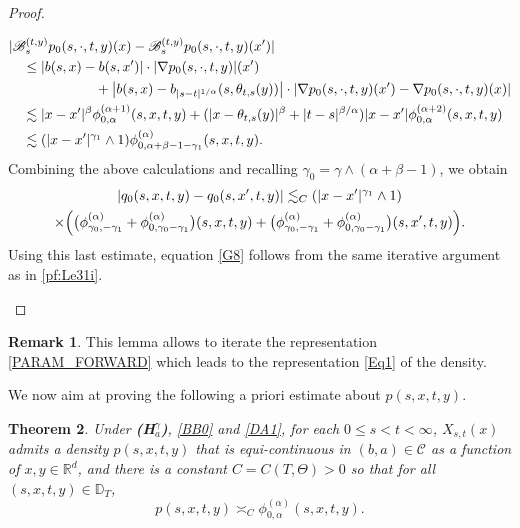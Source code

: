 \documentclass[JEP,XML,SOM,Unicode,published]{cedram}
\theoremstyle{plain}
\newtheorem{theorem}{Theorem}[section]
\theoremstyle{definition}
\newtheorem{remark}[theorem]{Remark}
\newcommand\mD{\mathbb{D}}
\newcommand\mR{\mathbb{R}}
\newcommand\1{{\mathbf{1}}}
\newcommand\sB{{\mathscr B}}
\newcommand\sC{{\mathscr C}}
\begin{document}
\begin{proof}
\begin{enumerate}
\begin{align*}
&|\sB^{(t,y)}_{s} p_0(s,\cdot,t,y)(x)-\sB^{(t,y)}_{s} p_0(s,\cdot,t,y)(x')|\\
&\quad\leq |b(s,x)-b(s,x')|\cdot|\nabla p_0(s,\cdot,t,y)|(x')
\\&\hspace*{2.2cm}+\big|b(s,x)-b_{|s-t|^{1/\alpha}}(s, \theta_{t,s}(y))\big|
\cdot |\nabla p_0(s,\cdot,t,y)(x')-\nabla p_0(s,\cdot,t,y)(x)|
\\&\quad\lesssim|x-x'|^\beta\phi^{(\alpha+1)}_{0,\alpha}(s,x,t,y)+(|x-\theta_{t,s}(y)|^\beta+|t-s|^{\beta/\alpha})|x-x'|\phi^{(\alpha+2)}_{0,\alpha}(s,x,t,y)
\\&\quad\lesssim(|x-x'|^{\gamma_1}\wedge 1)\phi^{(\alpha)}_{0,\alpha+\beta-1-\gamma_1}(s,x,t,y).
\end{align*}
Combining the above calculations and recalling $\gamma_0=\gamma\wedge(\alpha+\beta-1)$, we obtain
\begin{multline*}
|q_0(s,x,t,y)-q_0(s,x',t,y)|\lesssim_C(|x-x'|^{\gamma_1}\wedge1)
\\\times\Bigl(\bigl(\phi^{(\alpha)}_{\gamma_0,-\gamma_1}+\phi^{(\alpha)}_{0,\gamma_0-\gamma_1}\bigr)(s,x,t,y)
+\bigl(\phi^{(\alpha)}_{\gamma_0,-\gamma_1}+\phi^{(\alpha)}_{0,\gamma_0-\gamma_1}\bigr)(s,x',t,y)\Bigr).
\end{multline*}
Using this last estimate, equation \eqref{G8} follows from the same iterative argument as in \eqref{pf:Le31i}.\qedhere
\end{enumerate}
\end{proof}
\begin{remark}
This lemma allows to iterate the representation \eqref{PARAM_FORWARD} which leads to the representation \eqref{Eq1} of the density.
\end{remark}
We now aim at proving the following a priori estimate about $p(s,x,t,y)$.
\begin{theorem}\label{T8}
Under {\bf (H$^\gamma_a$)}, \eqref{BB0} and \eqref{DA1}, for each $0\leq s<t<\infty$,
$X_{s,t}(x)$ admits a density $p(s,x,t,y)$ that is equi-continuous in $(b,a)\in\sC$ as a function of $x,y\in\mR^d$,
and there is a constant $C=C(T,\Theta)>0$ so that for all $(s,x,t,y)\in\mD_T$,
\begin{equation*}%
p(s,x,t,y)\asymp_C \phi^{(\alpha)}_{0,\alpha}(s,x,t,y).
\end{equation*}
\end{theorem}
\end{document}
